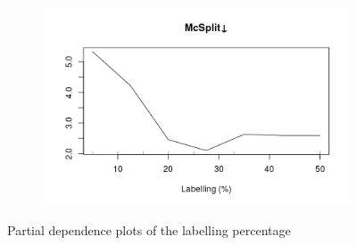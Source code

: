 \documentclass{l4proj}
\theoremstyle{definition}
\theoremstyle{remark}
\begin{document}
\begin{figure}
  \begin{subfigure}[t]{0.49\textwidth}
    \centering
    \includegraphics[width=\textwidth]{images/_both_labels_mcsplitdown_labelling_.png}
  \end{subfigure}
  \caption{Partial dependence plots of the labelling percentage}
  \label{fig:both_labels_partials2}
\end{figure}
\end{document}
